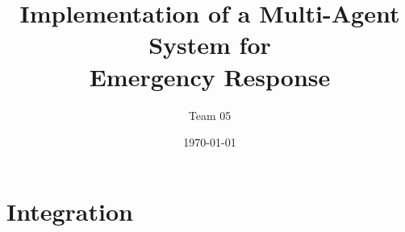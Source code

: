 \documentclass{beamer}
\title{Implementation of a Multi-Agent System for \\Emergency Response}
\author{Team 05}
\date{\today}
\begin{document}




















\section{Integration}





\end{document}

